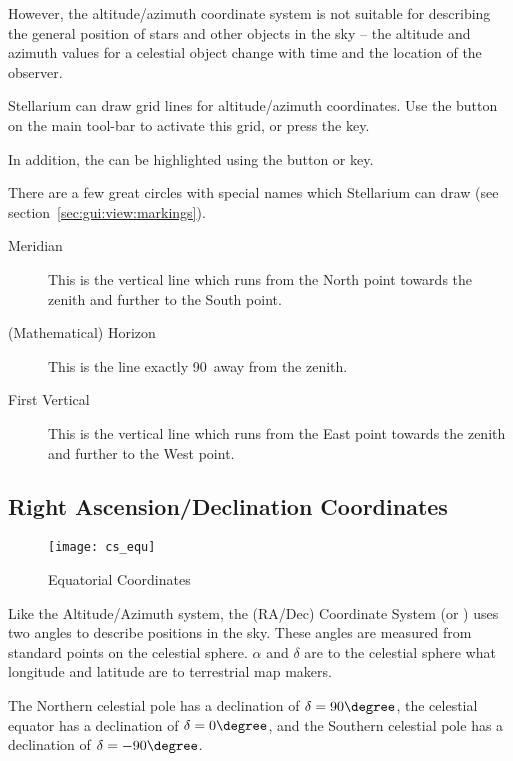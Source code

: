 However, the altitude/azimuth coordinate system is not suitable for
describing the general position of stars and other objects in the sky --
the altitude and azimuth values for a celestial object change with
time and the location of the observer.

Stellarium can draw grid lines for altitude/azimuth coordinates. Use the 
button on the main tool-bar to activate this grid, or press the  key.

In addition, the  can be highlighted using
the  button or  key.

There are a few great circles with special names which Stellarium can
draw (see section~\ref{sec:gui:view:markings}).
\begin{description}
\item[Meridian] This is the vertical line which runs from the North
  point towards the zenith and further to the South point.
\item[(Mathematical) Horizon] This is the line exactly 90\degree\ away
  from the zenith.
\item[First Vertical] This is the vertical line which runs from the East
  point towards the zenith and further to the West point.
\end{description}

\subsection{Right Ascension/Declination Coordinates}
\label{sec:Concepts:Equatorial}

\begin{figure}[ht]
\centering\texttt{[image: cs\_equ]}
\caption{Equatorial Coordinates}
\label{fig:EquatorialCoordinates}
\end{figure}

Like the Altitude/Azimuth system, the 
(RA/Dec) Coordinate System (or ) uses two angles to describe positions in the
sky. These angles are measured from standard points on the celestial
sphere.  $\alpha$ and  $\delta$ are to the celestial sphere what
longitude and latitude are to terrestrial map makers.

The Northern celestial pole has a declination of $\delta=90\degree$, the celestial
equator has a declination of $\delta=0\degree$, and the Southern celestial pole has a declination of $\delta=-90\degree$.

